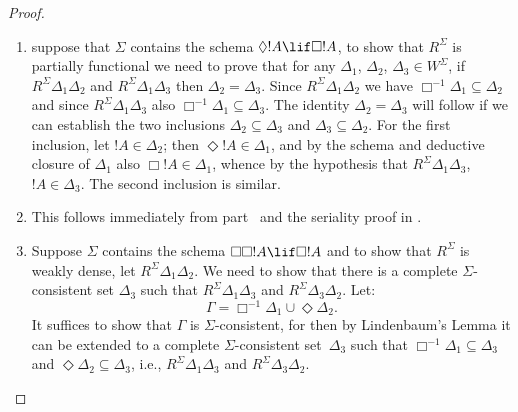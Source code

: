 \documentclass[../../../include/open-logic-section]{subfiles}
\begin{document}
\begin{proof}
  \begin{enumerate}
  \item suppose that $\Sigma$ contains the schema $\Diamond !A \lif
    \Box !A$, to show that $R^\Sigma$ is partially functional we need
    to prove that for any $\Delta_1$, $\Delta_2$, $\Delta_3 \in
    W^\Sigma$, if $R^\Sigma \Delta_1\Delta_2$ and $R^\Sigma
    \Delta_1\Delta_3$ then $\Delta_2=\Delta_3$. Since $R^\Sigma
    \Delta_1\Delta_2$ we have $\Box^{-1}\Delta_1 \subseteq \Delta_2$
    and since $R^\Sigma \Delta_1\Delta_3$ also $\Box^{-1}\Delta_1
    \subseteq \Delta_3$. The identity
    $\Delta_2=\Delta_3$ will follow if we can establish the two
    inclusions $\Delta_2 \subseteq \Delta_3$ and $\Delta_3 \subseteq
    \Delta_2$. For the first inclusion, let $!A \in \Delta_2$; then
    $\Diamond!A \in \Delta_1$, and by the schema and deductive closure
    of $\Delta_1$ also $\Box!A \in \Delta_1$, whence by the hypothesis
    that $R^\Sigma \Delta_1\Delta_3$, $!A \in \Delta_3$. The second
    inclusion is similar.

  \item This follows immediately from part~
    and the seriality proof in .

  \item Suppose $\Sigma$ contains the schema $\Box\Box!A \lif \Box!A$
    and to show that $R^\Sigma$ is weakly dense, let $R^\Sigma
    \Delta_1\Delta_2$. We need to show that there is a complete
    $\Sigma$-consistent set $\Delta_3$ such that $R^\Sigma
    \Delta_1\Delta_3$ and $R^\Sigma \Delta_3\Delta_2$. Let:
    \[
    \Gamma = \Box^{-1}\Delta_1 \cup \Diamond\Delta_2.
    \]
    It suffices to show that $\Gamma$ is $\Sigma$-consistent, for then
    by Lindenbaum's Lemma it can be extended to a complete
    $\Sigma$-consistent set~$\Delta_3$ such that $\Box^{-1}\Delta_1
    \subseteq \Delta_3$ and $\Diamond\Delta_2 \subseteq \Delta_3$,
    i.e., $R^\Sigma \Delta_1\Delta_3$ and $R^\Sigma
    \Delta_3\Delta_2$.


\end{enumerate}
\end{proof}
\end{document}
